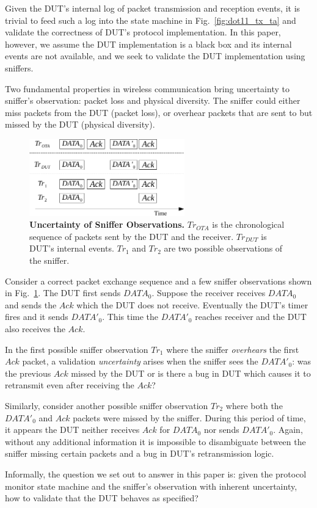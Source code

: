 Given the DUT's internal log of packet transmission and reception
events, it is trivial to feed such a log into the state machine in
Fig.~\ref{fig:dot11_tx_ta} and validate the correctness of DUT's protocol
implementation. In this paper, however, we assume the DUT implementation is a
black box and its internal events are not available, and we seek to validate the
DUT implementation using sniffers.

Two fundamental properties in wireless communication bring uncertainty
to sniffer's observation: packet loss and physical diversity. The sniffer could
either miss packets from the DUT (packet loss), or overhear packets that are
sent to but missed by the DUT (physical diversity).

\begin{figure}[H]
  \vspace*{-3mm}
  \centering
  \includegraphics[width=0.6\textwidth]{./figures/false_pos.pdf}
  \caption{\textbf{Uncertainty of Sniffer Observations.} $Tr_{OTA}$ is
    the chronological sequence of packets sent by the DUT and the receiver.
    $Tr_{DUT}$ is DUT's internal events. $Tr_1$ and $Tr_2$ are two possible observations
  of the sniffer.}
  \label{fig:sniffer_in_middle}
  \vspace*{-5mm}
\end{figure}

Consider a correct packet exchange sequence and a few sniffer observations
shown in Fig.~\ref{fig:sniffer_in_middle}. The DUT first sends
$DATA_0$.  Suppose the receiver receives $DATA_0$ and sends the $Ack$ which the
DUT does not receive. Eventually the DUT's timer fires and it sends $DATA'_0$.
This time the $DATA'_0$ reaches receiver and the DUT also receives the $Ack$.

In the first possible sniffer observation $Tr_1$ where the sniffer
\textit{overhears} the first $Ack$ packet, a validation \textit{uncertainty}
arises when the sniffer sees the $DATA'_0$: was the previous $Ack$ missed by the
DUT or is there a bug in DUT which causes it to retransmit even after receiving
the $Ack$?

Similarly, consider another possible sniffer observation $Tr_2$
where both the $DATA'_0$ and $Ack$ packets were missed by the sniffer.  During
this period of time, it appears the DUT neither receives $Ack$ for $DATA_0$ nor
sends $DATA'_0$.  Again, without any additional information it is impossible to
disambiguate between the sniffer missing certain packets and a bug in DUT's
retransmission logic.

Informally, the question we set out to answer in this paper is: given the
protocol monitor state machine and the sniffer's
observation with inherent uncertainty, how to validate that the DUT behaves as
specified?
